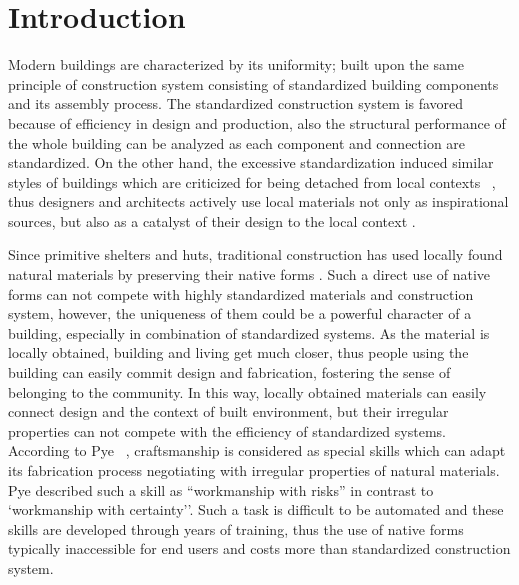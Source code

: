 \section{Introduction}
Modern buildings are characterized by its uniformity; built upon the same principle of construction system consisting of standardized building components and its assembly process.
The standardized construction system is favored because of efficiency in design and production, also the structural performance of the whole building can be analyzed as each component and connection are standardized.
On the other hand, the excessive standardization induced similar styles of buildings which are criticized for being detached from local contexts ~\cite{frampton1997towards}, thus designers and architects actively use local materials not only as inspirational sources, but also as a catalyst of their design to the local context \cite{oliver1997encyclopedia}.

Since primitive shelters and huts, traditional construction has used locally found natural materials by preserving their native forms \cite{weston2003materials}.
Such a direct use of native forms can not compete with highly standardized materials and construction system, however, the uniqueness of them could be a powerful character of a building, especially in combination of standardized systems.
As the material is locally obtained, building and living get much closer, thus people using the building can easily commit design and fabrication, fostering the sense of belonging to the community.
In this way, locally obtained materials can easily connect design and the context of built environment, but their irregular properties can not compete with the efficiency of standardized systems.
According to Pye ~, craftsmanship is considered as special skills which can adapt its fabrication process negotiating with irregular properties of natural materials.
Pye described such a skill as ``workmanship with risks'' in contrast to `workmanship with certainty''.
Such a task is difficult to be automated and these skills are developed through years of training, thus the use of native forms typically inaccessible for end users and costs more than standardized construction system.

